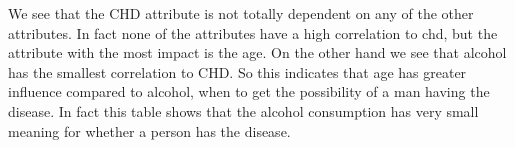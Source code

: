 We see that the CHD attribute is not totally dependent on any of the other attributes. In fact none of the attributes have a high correlation to chd, but the attribute with the most impact is the age. On the other hand we see that alcohol has the smallest correlation to CHD. So this indicates that age has greater influence compared to alcohol, when to get the possibility of a man having the disease. In fact this table shows that the alcohol consumption has very small meaning for whether a person has the disease.